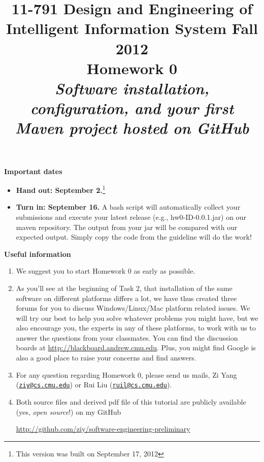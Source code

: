 \documentclass[oneside]{memoir}
\title{{\bfseries 11-791 Design and Engineering of Intelligent Information
System Fall 2012\\Homework 0}\\
\vspace{1em}
\itshape\rmfamily Software installation, configuration, and your first Maven
project hosted on GitHub}
\date{}
\begin{document}
\begin{titlingpage}
\maketitle

\hspace{-0.1\textwidth}
\begin{minipage}{1.2\textwidth}
\vspace{-5em}
\textbf{Important dates}
\begin{itemize}

\item \textbf{Hand out: September 2.}\footnote{This version was built on
September 17, 2012}

\item \textbf{Turn in: September 16.} A bash script will automatically collect
your submissions and execute your latest release (e.g., hw0-ID-0.0.1.jar) on our
maven repository. The output from your jar will be compared with our expected
output. Simply copy the code from the guideline will do the work!
\end{itemize}

\textbf{Useful information}
\begin{enumerate}
\item We suggest you to start Homework 0 as early as possible.

\item As you'll see at the beginning of Task 2, that installation of the same
software on different platforms differs a lot, we have thus created three forums
for you to discuss Windows/Linux/Mac platform related issues. We will try our
best to help you solve whatever problems you might have, but we also encourage
you, the experts in any of these platforms, to work with us to answer the
questions from your classmates. You can find the discussion boards at
\url{http://blackboard.andrew.cmu.edu}. Plus, you might find Google is also a
good place to raise your concerns and find answers.

\item For any question regarding Homework 0, please send us mails, Zi Yang
(\href{mailto:ziy@cs.cmu.edu}{\nolinkurl{ziy@cs.cmu.edu}}) or Rui Liu
(\href{mailto:ruil@cs.cmu.edu}{\nolinkurl{ruil@cs.cmu.edu}}).

\item Both source files and derived pdf file of this tutorial are publicly
available (yes, \emph{open source}!) on my GitHub

\url{http://github.com/ziy/software-engineering-preliminary}


\end{enumerate}
\end{minipage}
\end{titlingpage}
\end{document}
